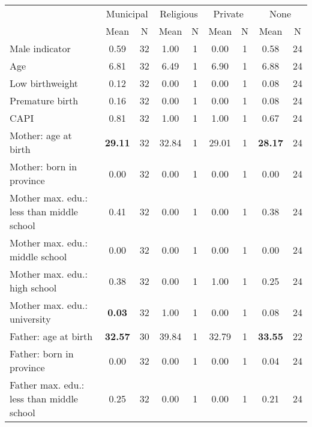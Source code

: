 \begin{tabular}{l c c c c c c c c}
\toprule
& \multicolumn{2}{c}{Municipal} & \multicolumn{2}{c}{Religious} & \multicolumn{2}{c}{Private} & \multicolumn{2}{c}{None} \\
& \scriptsize Mean & \scriptsize N & \scriptsize Mean & \scriptsize N & \scriptsize Mean & \scriptsize N & \scriptsize Mean & \scriptsize N \\
\midrule
Male indicator &      0.59 &        32 &      1.00 &         1 &      0.00 &         1 &      0.58 &        24 \\
Age &      6.81 &        32 &      6.49 &         1 &      6.90 &         1 &      6.88 &        24 \\
Low birthweight &      0.12 &        32 &      0.00 &         1 &      0.00 &         1 &      0.08 &        24 \\
Premature birth &      0.16 &        32 &      0.00 &         1 &      0.00 &         1 &      0.08 &        24 \\
CAPI &      0.81 &        32 &      1.00 &         1 &      1.00 &         1 &      0.67 &        24 \\
Mother: age at birth & \textbf{    29.11} &        32 &     32.84 &         1 &     29.01 &         1 & \textbf{    28.17} &        24 \\
Mother: born in province &      0.00 &        32 &      0.00 &         1 &      0.00 &         1 &      0.00 &        24 \\
Mother max. edu.: less than middle school &      0.41 &        32 &      0.00 &         1 &      0.00 &         1 &      0.38 &        24 \\
Mother max. edu.: middle school &      0.00 &        32 &      0.00 &         1 &      0.00 &         1 &      0.00 &        24 \\
Mother max. edu.: high school &      0.38 &        32 &      0.00 &         1 &      1.00 &         1 &      0.25 &        24 \\
Mother max. edu.: university & \textbf{     0.03} &        32 &      1.00 &         1 &      0.00 &         1 &      0.08 &        24 \\
Father: age at birth & \textbf{    32.57} &        30 &     39.84 &         1 &     32.79 &         1 & \textbf{    33.55} &        22 \\
Father: born in province &      0.00 &        32 &      0.00 &         1 &      0.00 &         1 &      0.04 &        24 \\
Father max. edu.: less than middle school &      0.25 &        32 &      0.00 &         1 &      0.00 &         1 &      0.21 &        24 \\

\end{tabular}
